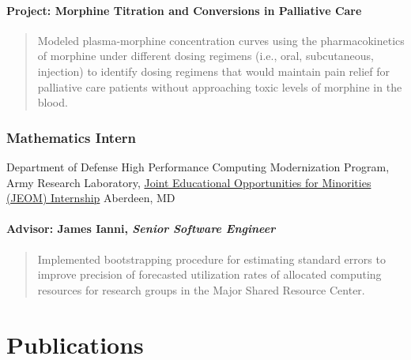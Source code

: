 \documentclass[
  fleqn, oneside]{article}
\begin{document}
\hypertarget{project-morphine-titration-and-conversions-in-palliative-care}{%
\paragraph{Project: Morphine Titration and Conversions in Palliative
Care}\label{project-morphine-titration-and-conversions-in-palliative-care}}

\begin{quote}
Modeled plasma-morphine concentration curves using the pharmacokinetics
of morphine under different dosing regimens (i.e., oral, subcutaneous,
injection) to identify dosing regimens that would maintain pain relief
for palliative care patients without approaching toxic levels of
morphine in the blood.
\end{quote}

\hypertarget{mathematics-intern-2009}{%
\subsubsection{\texorpdfstring{Mathematics Intern
\hfill{}}{Mathematics Intern 2009}}\label{mathematics-intern-2009}}

Department of Defense High Performance Computing Modernization Program,
Army Research Laboratory,
\href{http//www.hpcmo.hpc.mil/community/JEOM/index.php}{Joint
Educational Opportunities for Minorities (JEOM) Internship} \newline
Aberdeen, MD

\hypertarget{advisor-james-ianni-senior-software-engineer}{%
\paragraph{\texorpdfstring{Advisor: James Ianni, \emph{Senior Software
Engineer}}{Advisor: James Ianni, Senior Software Engineer}}\label{advisor-james-ianni-senior-software-engineer}}

\begin{quote}
Implemented bootstrapping procedure for estimating standard errors to
improve precision of forecasted utilization rates of allocated computing
resources for research groups in the Major Shared Resource Center.
\end{quote}

\hypertarget{publications}{%
\section{Publications}\label{publications}}
\end{document}
